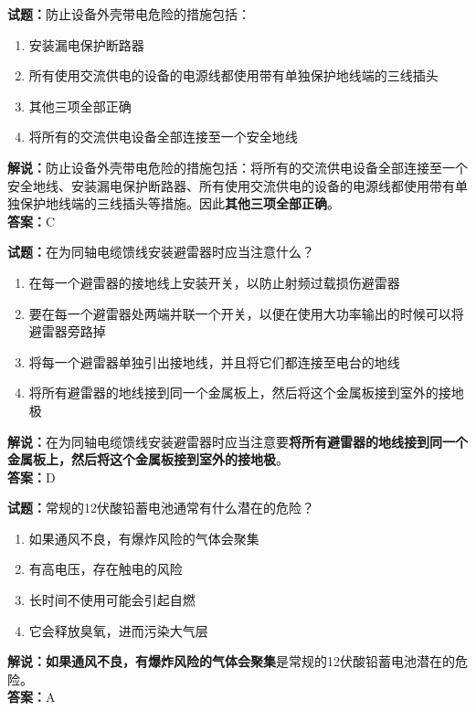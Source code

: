 \documentclass{ctexbook}
\begin{document}
\bigskip


\noindent\textbf{试题：}防止设备外壳带电危险的措施包括：
\begin{enumerate}[leftmargin=3em]
	\item 安装漏电保护断路器
	\item 所有使用交流供电的设备的电源线都使用带有单独保护地线端的三线插头
	\item 其他三项全部正确
	\item 将所有的交流供电设备全部连接至一个安全地线
\end{enumerate}
\noindent\textbf{解说：}防止设备外壳带电危险的措施包括：将所有的交流供电设备全部连接至一个安全地线、安装漏电保护断路器、所有使用交流供电的设备的电源线都使用带有单独保护地线端的三线插头等措施。因此\textbf{其他三项全部正确}。\\\noindent\textbf{答案：}C

\bigskip


\noindent\textbf{试题：}在为同轴电缆馈线安装避雷器时应当注意什么？
\begin{enumerate}[leftmargin=3em]
	\item 在每一个避雷器的接地线上安装开关，以防止射频过载损伤避雷器
	\item 要在每一个避雷器处两端并联一个开关，以便在使用大功率输出的时候可以将避雷器旁路掉
	\item 将每一个避雷器单独引出接地线，并且将它们都连接至电台的地线
	\item 将所有避雷器的地线接到同一个金属板上，然后将这个金属板接到室外的接地极
\end{enumerate}
\noindent\textbf{解说：}在为同轴电缆馈线安装避雷器时应当注意要\textbf{将所有避雷器的地线接到同一个金属板上，然后将这个金属板接到室外的接地极}。\\\noindent\textbf{答案：}D

\bigskip


\noindent\textbf{试题：}常规的12伏酸铅蓄电池通常有什么潜在的危险？
\begin{enumerate}[leftmargin=3em]
	\item 如果通风不良，有爆炸风险的气体会聚集
	\item 有高电压，存在触电的风险
	\item 长时间不使用可能会引起自燃
	\item 它会释放臭氧，进而污染大气层
\end{enumerate}
\noindent\textbf{解说：}\textbf{如果通风不良，有爆炸风险的气体会聚集}是常规的12伏酸铅蓄电池潜在的危险。\\\noindent\textbf{答案：}A
\end{document}
